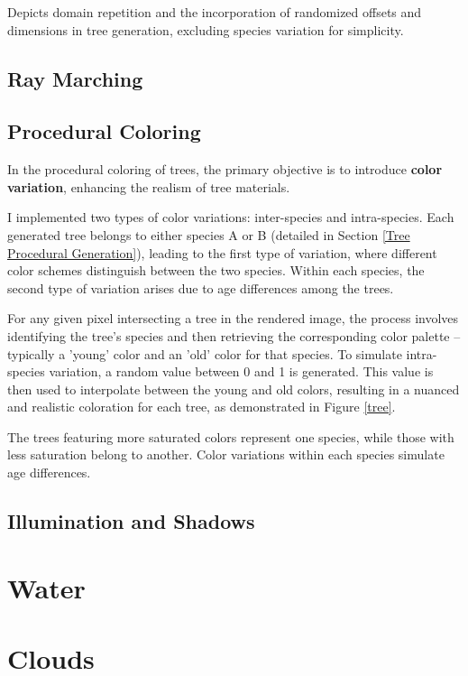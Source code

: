 {Depicts domain repetition and the incorporation of randomized offsets and dimensions in tree generation, excluding species variation for simplicity.}

\subsection{Ray Marching}

\subsection{Procedural Coloring}

In the procedural coloring of trees, the primary objective is to introduce \textbf{color variation}, enhancing the realism of tree materials. 

I implemented two types of color variations: inter-species and intra-species. Each generated tree belongs to either species A or B (detailed in Section \ref{Tree Procedural Generation}), leading to the first type of variation, where different color schemes distinguish between the two species. Within each species, the second type of variation arises due to age differences among the trees. 

For any given pixel intersecting a tree in the rendered image, the process involves identifying the tree's species and then retrieving the corresponding color palette -- typically a 'young' color and an 'old' color for that species. To simulate intra-species variation, a random value between 0 and 1 is generated. This value is then used to interpolate between the young and old colors, resulting in a nuanced and realistic coloration for each tree, as demonstrated in Figure \ref{tree}.

{The trees featuring more saturated colors represent one species, while those with less saturation belong to another. Color variations within each species simulate age differences.}

\subsection{Illumination and Shadows}

\section{Water}

\section{Clouds}

